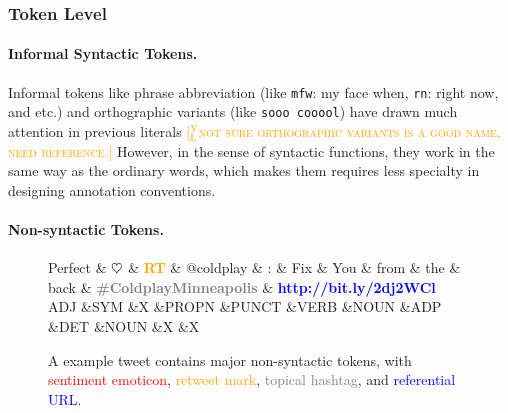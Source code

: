 \documentclass[11pt,letterpaper]{article}
\newcommand{\heart}{\ensuremath\heartsuit}
\newcommand{\yjcomment}[1]{\textcolor{orange}{[$_\mathrm{L}^\mathrm{Y}$\textsc{#1}]}}
\begin{document}
\subsubsection{Token Level}
\paragraph{Informal Syntactic Tokens.}
Informal tokens like phrase abbreviation (like {\tt mfw}: my face when, {\tt rn}: right now, and etc.) and orthographic variants (like {\tt sooo cooool}) have drawn much attention in previous literals \cite{finin-EtAl:2010:MTURK,eisenstein:2013:NAACL-HLT} \yjcomment{not sure orthographic variants is a good name, need reference.}
However, in the sense of syntactic functions, they work in the same way as the ordinary words, which makes them requires less specialty in designing annotation conventions.

\paragraph{Non-syntactic Tokens.}

\begin{figure*}[t]
	\centering
	\small
	\begin{dependency}[edge slant=2, text only label, label style=above]
		\begin{deptext}
			Perfect \& \textcolor{red}{\bf $\heart$} \& \textcolor{orange}{\bf RT} \& @coldplay \& : \& Fix \& You \& from \& the \& back \& \textcolor{gray}{\bf \#ColdplayMinneapolis} \& \textcolor{blue}{\bf http://bit.ly/2dj2WCl}\\
			\tiny ADJ \&\tiny SYM \&\tiny X \&\tiny PROPN \&\tiny PUNCT \&\tiny VERB \&\tiny NOUN \&\tiny ADP \&\tiny DET \&\tiny NOUN \&\tiny X \&\tiny X \\
		\end{deptext}
	\end{dependency}
	\caption{A example tweet contains major non-syntactic tokens, with
		\textcolor{red}{sentiment emoticon},
		\textcolor{orange}{retweet mark},
		\textcolor{gray}{topical hashtag}, and
		\textcolor{blue}{referential URL}.}\label{fig:non-syn-toks}
\end{figure*}
\end{document}
